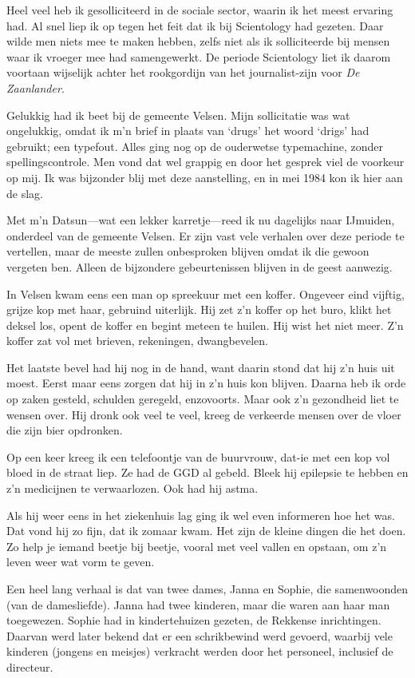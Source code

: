 \documentclass[12pt,twoside]{memoir}
\begin{document}
Heel veel heb ik gesolliciteerd in de sociale sector, waarin ik het meest ervaring had. Al snel liep ik op tegen het feit dat ik bij Scientology had gezeten. Daar wilde men niets mee te maken hebben, zelfs niet als ik solliciteerde bij mensen waar ik vroeger mee had samengewerkt. De periode Scientology liet ik daarom voortaan wijselijk achter het rookgordijn van het journalist-zijn voor \emph{De Zaanlander}.

Gelukkig had ik beet bij de gemeente Velsen. Mijn sollicitatie was wat ongelukkig, omdat ik m’n brief in plaats van `drugs' het woord `drigs' had gebruikt; een typefout. Alles ging nog op de ouderwetse typemachine, zonder spellingscontrole. Men vond dat wel grappig en door het gesprek viel de voorkeur op mij. Ik was bijzonder blij met deze aanstelling, en in mei 1984 kon ik hier aan de slag.

Met m’n Datsun---wat een lekker karretje---reed ik nu dagelijks naar IJmuiden, onderdeel van de gemeente Velsen. Er zijn vast vele verhalen over deze periode te vertellen, maar de meeste zullen onbesproken blijven omdat ik die gewoon vergeten ben. Alleen de bijzondere gebeurtenissen blijven in de geest aanwezig.

In Velsen kwam eens een man op spreekuur met een koffer. Ongeveer eind vijftig, grijze kop met haar, gebruind uiterlijk. Hij zet z’n koffer op het buro, klikt het deksel los, opent de koffer en begint meteen te huilen. Hij wist het niet meer. Z’n koffer zat vol met brieven, rekeningen, dwangbevelen. 

Het laatste bevel had hij nog in de hand, want daarin stond dat hij z’n huis uit moest. Eerst maar eens zorgen dat hij in z’n huis kon blijven. Daarna heb ik orde op zaken gesteld, schulden geregeld, enzovoorts. Maar ook z’n gezondheid liet te wensen over. Hij dronk ook veel te veel, kreeg de verkeerde mensen over de vloer die zijn bier opdronken. 

Op een keer kreeg ik een telefoontje van de buurvrouw, dat-ie met een kop vol bloed in de straat liep. Ze had de GGD al gebeld. Bleek hij epilepsie te hebben en z’n medicijnen te verwaarlozen. Ook had hij astma. 

Als hij weer eens in het ziekenhuis lag ging ik wel even informeren hoe het was. Dat vond hij zo fijn, dat ik zomaar kwam. Het zijn de kleine dingen die het doen. Zo help je iemand beetje bij beetje, vooral met veel vallen en opstaan, om z’n leven weer wat vorm te geven.

Een heel lang verhaal is dat van twee dames, Janna en Sophie, die samenwoonden (van de damesliefde). Janna had twee kinderen, maar die waren aan haar man toegewezen. Sophie had in kindertehuizen gezeten, de Rekkense inrichtingen. Daarvan werd later bekend dat er een schrikbewind werd gevoerd, waarbij vele kinderen (jongens en meisjes) verkracht werden door het personeel, inclusief de directeur. 
\end{document}
